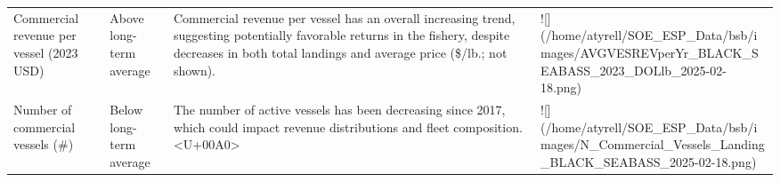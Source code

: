 \documentclass[
]{article}
\begin{document}
\begin{longtable}[t]{lll>{\raggedright\arraybackslash}p{30em}}
Commercial revenue per vessel (2023 USD) & Above long-term average & Commercial revenue per vessel has an overall increasing trend, suggesting potentially favorable returns in the fishery, despite decreases in both total landings and average price (\$/lb.; not shown). & ![](/home/atyrell/SOE\_ESP\_Data/bsb/images/AVGVESREVperYr\_BLACK\_SEABASS\_2023\_DOLlb\_2025-02-18.png)\\
\addlinespace
Number of commercial vessels (\#) & Below long-term average & The number of active vessels has been decreasing since 2017, which could impact revenue distributions and fleet composition.<U+00A0> & ![](/home/atyrell/SOE\_ESP\_Data/bsb/images/N\_Commercial\_Vessels\_Landing\_BLACK\_SEABASS\_2025-02-18.png)\\
\bottomrule
\end{longtable}
\end{document}
